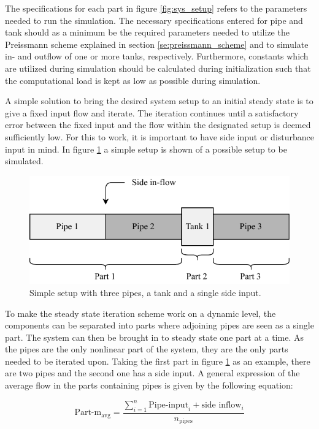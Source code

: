 The specifications for each part in figure \ref{fig:sys_setup} refers to the parameters needed to run the simulation.
The necessary specifications entered for pipe and tank should as a minimum be the required parameters needed to utilize the Preissmann scheme explained in section \ref{se:preissmann_scheme} and to simulate in- and outflow of one or more tanks, respectively. Furthermore, constants which are utilized during simulation should be calculated during initialization such that the computational load is kept as low as possible during simulation. 

A simple solution to bring the desired system setup to an initial steady state is to give a fixed input flow and iterate. 
The iteration continues until a satisfactory error between the fixed input and the flow within the designated setup is deemed sufficiently low. For this to work, it is important to have side input or disturbance input in mind. In figure \ref{fig:simple_sewer} a simple setup is shown of a possible setup to be simulated. 

\begin{figure}[H]
\centering
\includegraphics[width=0.55 \textwidth]{report/simulation/pictures/simple_sewer.pdf}
\caption{Simple setup with three pipes, a tank and a single side input.}
\label{fig:simple_sewer}
\end{figure}

To make the steady state iteration scheme work on a dynamic level, the components can be separated into parts where adjoining pipes are seen as a single part. The system can then be brought in to steady state one part at a time. As the pipes are the only nonlinear part of the system, they are the only parts needed to be iterated upon. Taking the first part in figure \ref{fig:simple_sewer} as an example, there are two pipes and the second one has a side input.
A general expression of the average flow in the parts containing pipes is given by the following equation:

\begin{equation}
 \text{Part-m}_{\text{avg}}	=  \frac{ \sum\limits_{i=1}^n \text{Pipe-input}_i + \text{side inflow}_i }{ n_{\text{pipes}} } 
 \end{equation} \label{avg_init_flow}

